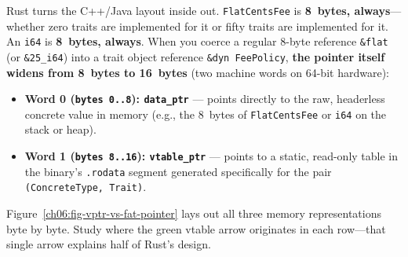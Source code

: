Rust turns the C++/Java layout inside out. \texttt{FlatCentsFee} is \textbf{8~bytes, always}---whether zero traits are implemented for it or fifty traits are implemented for it. An \texttt{i64} is \textbf{8~bytes, always}. When you coerce a regular 8-byte reference \texttt{\&flat} (or \texttt{\&25\_i64}) into a trait object reference \texttt{\&dyn FeePolicy}, \textbf{the pointer itself widens from 8~bytes to 16~bytes} (two machine words on 64-bit hardware):

\begin{itemize}
  \item \textbf{Word 0 (\texttt{bytes 0..8}): \texttt{data\_ptr}} --- points directly to the raw, headerless concrete value in memory (e.g., the 8~bytes of \texttt{FlatCentsFee} or \texttt{i64} on the stack or heap).
  \item \textbf{Word 1 (\texttt{bytes 8..16}): \texttt{vtable\_ptr}} --- points to a static, read-only table in the binary's \texttt{.rodata} segment generated specifically for the pair \texttt{(ConcreteType, Trait)}.
\end{itemize}

Figure~\ref{ch06:fig-vptr-vs-fat-pointer} lays out all three memory representations byte by byte. Study where the green vtable arrow originates in each row---that single arrow explains half of Rust's design.

